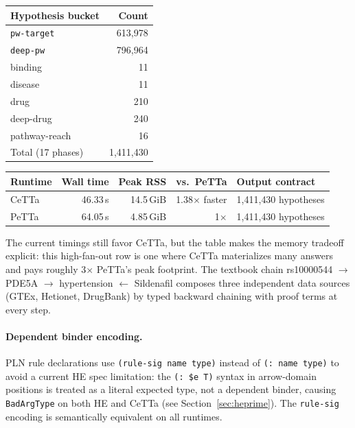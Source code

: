 \documentclass[11pt]{article}
\newcommand{\code}[1]{\texttt{#1}}
\newcommand{\PeTTa}{\textup{PeTTa}}
\newcommand{\CeTTa}{\textup{CeTTa}}
\begin{document}
\begin{center}
\begin{tabular}{lr}
\toprule
Hypothesis bucket & Count \\
\midrule
\code{pw-target} & 613{,}978 \\
\code{deep-pw} & 796{,}964 \\
binding & 11 \\
disease & 11 \\
drug & 210 \\
deep-drug & 240 \\
pathway-reach & 16 \\
\midrule
Total (17 phases) & 1{,}411{,}430 \\
\bottomrule
\end{tabular}
\end{center}

\begin{center}
\begin{tabular}{lrrrl}
\toprule
Runtime & Wall time & Peak RSS & vs.\ \PeTTa{} & Output contract \\
\midrule
\CeTTa{} & 46.33\,s & 14.5\,GiB & 1.38$\times$ faster & 1{,}411{,}430 hypotheses \\
\PeTTa{} & 64.05\,s & 4.85\,GiB & 1$\times$ & 1{,}411{,}430 hypotheses \\
\bottomrule
\end{tabular}
\end{center}

\noindent The current timings still favor \CeTTa{}, but the table makes
the memory tradeoff explicit: this high-fan-out row is one where
\CeTTa{} materializes many answers and pays roughly 3$\times$ \PeTTa{}'s
peak footprint.
The textbook chain
rs10000544 $\to$ PDE5A $\to$ hypertension $\leftarrow$ Sildenafil
composes three independent data sources (GTEx, Hetionet, DrugBank) by
typed backward chaining with proof terms at every step.

\paragraph{Dependent binder encoding.}
PLN rule declarations use \code{(rule-sig name type)} instead of
\code{(: name type)} to avoid a current HE spec limitation: the
\code{(: \$e T)} syntax in arrow-domain positions is treated as a
literal expected type, not a dependent binder, causing \code{BadArgType}
on both HE and \CeTTa{} (see Section~\ref{sec:heprime}).
The \code{rule-sig} encoding is semantically equivalent on all runtimes.
\end{document}
